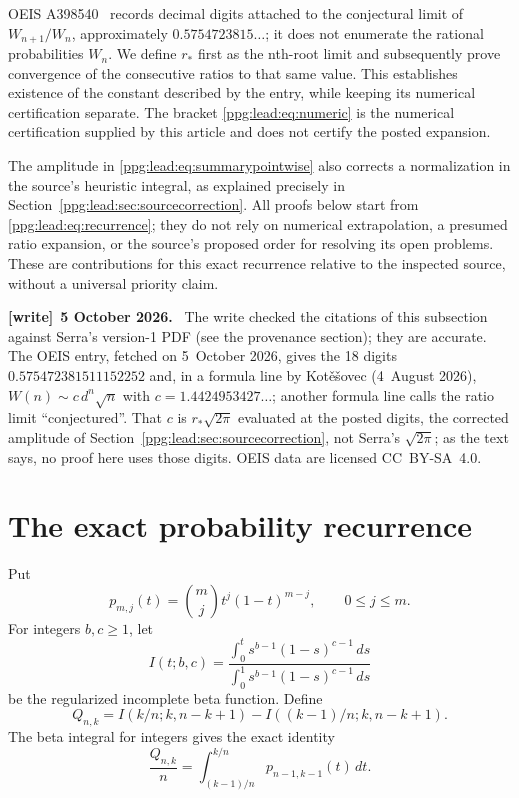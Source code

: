 \documentclass[11pt,letterpaper]{article}
\theoremstyle{remark}\newtheorem{remark}[theorem]{Remark}
\numberwithin{equation}{section}
\newenvironment{writenote}[1][]{\par\smallskip\begingroup\small
 \noindent\textbf{[write]}\if\relax\detokenize{#1}\relax\else~\textbf{#1.}\fi\ }%
 {\par\endgroup\smallskip}
\begin{document}
OEIS A398540~\cite{oeis} records decimal digits attached to the conjectural limit of $W_{n+1}/W_n$, approximately $0.5754723815\ldots$; it does not enumerate the rational probabilities $W_n$. We define $r_*$ first as the nth-root limit and subsequently prove convergence of the consecutive ratios to that same value. This establishes existence of the constant described by the entry, while keeping its numerical certification separate. The bracket \eqref{ppg:lead:eq:numeric} is the numerical certification supplied by this article and does not certify the posted expansion.

The amplitude in \eqref{ppg:lead:eq:summarypointwise} also corrects a normalization in the source's heuristic integral, as explained precisely in Section~\ref{ppg:lead:sec:sourcecorrection}. All proofs below start from \eqref{ppg:lead:eq:recurrence}; they do not rely on numerical extrapolation, a presumed ratio expansion, or the source's proposed order for resolving its open problems. These are contributions for this exact recurrence relative to the inspected source, without a universal priority claim.
\begin{writenote}[5 October 2026]
The write checked the citations of this subsection against Serra's version-1 PDF (see the provenance section); they are accurate. The OEIS entry, fetched on 5~October 2026, gives the 18 digits $0.575472381511152252$ and, in a formula line by Kot\v{e}\v{s}ovec (4~August 2026), $W(n)\sim c\,d^n\sqrt n$ with $c=1.4424953427\ldots$; another formula line calls the ratio limit ``conjectured''. That $c$ is $r_*\sqrt{2\pi}$ evaluated at the posted digits, the corrected amplitude of Section~\ref{ppg:lead:sec:sourcecorrection}, not Serra's $\sqrt{2\pi}$; as the text says, no proof here uses those digits. OEIS data are licensed CC~BY-SA~4.0.
\end{writenote}

\section{The exact probability recurrence}\label{ppg:lead:sec:recurrence}
Put
\[
 p_{m,j}(t)=\binom mj t^j(1-t)^{m-j},\qquad 0\le j\le m.
\]
For integers $b,c\ge1$, let
\[
 I(t;b,c)=\frac{\int_0^t s^{b-1}(1-s)^{c-1}\,ds}
                   {\int_0^1 s^{b-1}(1-s)^{c-1}\,ds}
\]
be the regularized incomplete beta function. Define
\begin{equation}\label{ppg:lead:eq:Q}
 Q_{n,k}=I(k/n;k,n-k+1)-I((k-1)/n;k,n-k+1).
\end{equation}
The beta integral for integers gives the exact identity
\begin{equation}\label{ppg:lead:eq:integral}
 \frac{Q_{n,k}}n=\int_{(k-1)/n}^{k/n}p_{n-1,k-1}(t)\,dt.
\end{equation}
\end{document}
